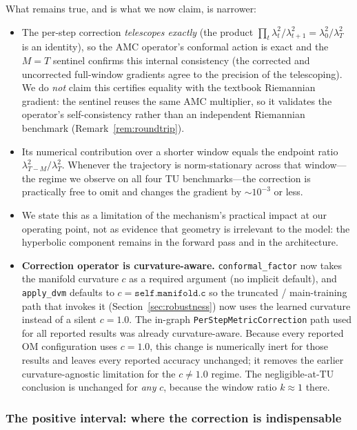 \documentclass[a4paper,fleqn]{cas-dc}
\begin{document}
What remains true, and is what we now claim, is narrower:

\begin{itemize}
    \item The per-step correction \emph{telescopes exactly} (the product $\prod_t \lambda_t^2/\lambda_{t+1}^2 = \lambda_0^2/\lambda_T^2$ is an identity), so the AMC operator's conformal action is exact and the $M{=}T$ sentinel confirms this internal consistency (the corrected and uncorrected full-window gradients agree to the precision of the telescoping). We do \emph{not} claim this certifies equality with the textbook Riemannian gradient: the sentinel reuses the same AMC multiplier, so it validates the operator's self-consistency rather than an independent Riemannian benchmark (Remark~\ref{rem:roundtrip}).
    \item Its numerical contribution over a shorter window equals the endpoint ratio $\lambda_{T-M}^2/\lambda_T^2$. Whenever the trajectory is norm-stationary across that window---the regime we observe on all four TU benchmarks---the correction is practically free to omit and changes the gradient by $\sim10^{-3}$ or less.
    \item We state this as a limitation of the mechanism's practical impact at our operating point, not as evidence that geometry is irrelevant to the model: the hyperbolic component remains in the forward pass and in the architecture.
    \item \textbf{Correction operator is curvature-aware.} \texttt{conformal\_factor} now takes the manifold curvature $c$ as a required argument (no implicit default), and \texttt{apply\_dvm} defaults to $c{=}\texttt{self.manifold.c}$ so the truncated / main-training path that invokes it (Section~\ref{sec:robustness}) now uses the learned curvature instead of a silent $c{=}1.0$. The in-graph \texttt{PerStepMetricCorrection} path used for all reported results was already curvature-aware. Because every reported OM configuration uses $c{=}1.0$, this change is numerically inert for those results and leaves every reported accuracy unchanged; it removes the earlier curvature-agnostic limitation for the $c{\neq}1.0$ regime. The negligible-at-TU conclusion is unchanged for \emph{any} $c$, because the window ratio $k\approx1$ there.
\end{itemize}

\subsubsection{The positive interval: where the correction is indispensable}
\end{document}
